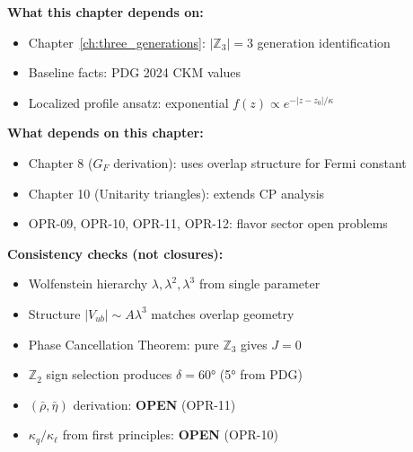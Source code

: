 
\begin{tcolorbox}[colback=gray!5!white, colframe=gray!60!black,
    title=\textbf{Dependency Map \& Status}]
\textbf{What this chapter depends on:}
\begin{itemize}[nosep]
    \item Chapter~\ref{ch:three_generations}: $|\mathbb{Z}_3| = 3$ generation identification
    \item Baseline facts: PDG 2024 CKM values \tagBL{}
    \item Localized profile ansatz: exponential $f(z) \propto e^{-|z-z_0|/\kappa}$ \tagP{}
\end{itemize}

\textbf{What depends on this chapter:}
\begin{itemize}[nosep]
    \item Chapter 8 ($G_F$ derivation): uses overlap structure for Fermi constant
    \item Chapter 10 (Unitarity triangles): extends CP analysis
    \item OPR-09, OPR-10, OPR-11, OPR-12: flavor sector open problems
\end{itemize}

\textbf{Consistency checks (not closures):}
\begin{itemize}[nosep]
    \item[\ding{51}] Wolfenstein hierarchy $\lambda, \lambda^2, \lambda^3$ from single parameter \tagDc{}
    \item[\ding{51}] Structure $|V_{ub}| \sim A\lambda^3$ matches overlap geometry \tagDc{}
    \item[\ding{51}] Phase Cancellation Theorem: pure $\mathbb{Z}_3$ gives $J = 0$ \tagDc{}
    \item[\ding{51}] $\mathbb{Z}_2$ sign selection produces $\delta = 60°$ (5° from PDG) \tagDc{}
    \item[$\circ$] $(\bar\rho, \bar\eta)$ derivation: \textbf{OPEN} (OPR-11)
    \item[$\circ$] $\kappa_q / \kappa_\ell$ from first principles: \textbf{OPEN} (OPR-10)
\end{itemize}
\end{tcolorbox}

